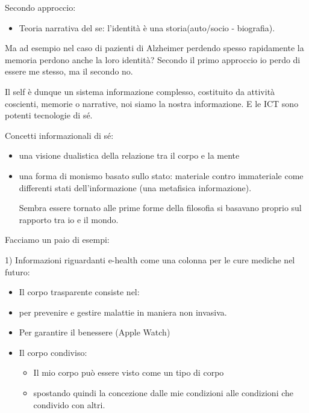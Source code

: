 \documentclass[]{article}
\begin{document}
Secondo approccio:

\begin{itemize}
	 
	\item
	Teoria narrativa del se: l'identità è una storia(auto/socio - biografia).
\end{itemize}

Ma ad esempio nel caso di pazienti di Alzheimer perdendo spesso
rapidamente la memoria perdono anche la loro identità? Secondo il primo
approccio io perdo di essere me stesso, ma il secondo no.

Il self è dunque un sistema informazione complesso, costituito da
attività coscienti, memorie o narrative, noi siamo la nostra
informazione. E le ICT sono potenti tecnologie di sé.

Concetti informazionali di sé:

\begin{itemize}
	\item
	una visione dualistica della relazione tra il corpo e la mente
	\item
	una forma di monismo basato sullo stato: materiale contro immateriale
	come differenti stati dell'informazione (una metafisica informazione).
	
	Sembra essere tornato alle prime forme della filosofia si basavano
	proprio sul rapporto tra io e il mondo.
\end{itemize}

Facciamo un paio di esempi:

1) Informazioni riguardanti e-health come una colonna per le cure
mediche nel futuro:

\begin{itemize}
	 
	\item
	Il corpo trasparente consiste nel:
\end{itemize}

\begin{itemize}
	 
	\item
	per prevenire e gestire malattie in maniera non invasiva.
	\item
	Per garantire il benessere (Apple Watch)
\end{itemize}

\begin{itemize}
	\item
	Il corpo condiviso:
	
	\begin{itemize}
		 
		\item
		Il mio corpo può essere visto come un tipo di corpo
		\item
		spostando quindi la concezione dalle mie condizioni alle condizioni
		che condivido con altri.
	\end{itemize}
\end{itemize}
\end{document}
